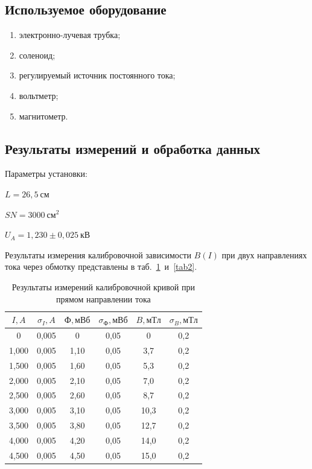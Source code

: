 \documentclass[a4paper, 12pt]{article}
\begin{document}
\subsection{Используемое оборудование}

\begin{enumerate}
    \item электронно-лучевая трубка;
    \item соленоид;
    \item регулируемый источник постоянного тока;
    \item вольтметр;
    \item магнитометр.
\end{enumerate}

\subsection{Результаты измерений и обработка данных}

Параметры установки:
\begin{description}
\item{} $L = 26,5~см$
\item{} $SN = 3000~см^2$
\item{} $U_A = 1,230\pm0,025~кВ$
\end{description}

Результаты измерения калибровочной зависимости $B(I)$ при двух направлениях тока через обмотку представлены в таб.~\ref{tab1}~и~\ref{tab2}.

\begin{table}[h!]
\begin{center}
\begin{tabular}{|c|c|c|c|c|c|}
\hline
$I, A$ & $\sigma_{I}, A$ & $Ф, мВб$ & $\sigma_{Ф}, мВб$ & $B, мТл$ & $\sigma_{B}, мТл$ \\ \hline
0      & 0,005   & 0        & 0,05      & 0        & 0,2       \\ \hline
1,000  & 0,005   & 1,10     & 0,05      & 3,7      & 0,2       \\ \hline
1,500  & 0,005   & 1,60     & 0,05      & 5,3      & 0,2       \\ \hline
2,000  & 0,005   & 2,10     & 0,05      & 7,0      & 0,2       \\ \hline
2,500  & 0,005   & 2,60     & 0,05      & 8,7      & 0,2       \\ \hline
3,000  & 0,005   & 3,10     & 0,05      & 10,3     & 0,2       \\ \hline
3,500  & 0,005   & 3,80     & 0,05      & 12,7     & 0,2       \\ \hline
4,000  & 0,005   & 4,20     & 0,05      & 14,0     & 0,2       \\ \hline
4,500  & 0,005   & 4,50     & 0,05      & 15,0     & 0,2       \\ \hline
\end{tabular}
\end{center}
\caption{Результаты измерений калибровочной кривой при прямом направлении тока}
\label{tab1}
\end{table}
\end{document}
